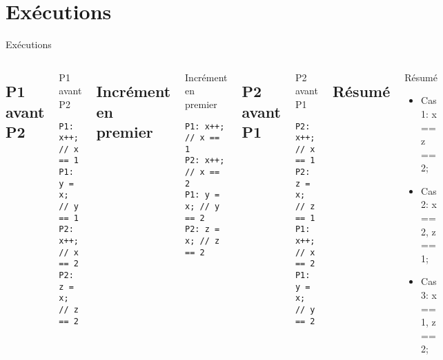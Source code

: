\def\sectitle{Exécutions}
\section{\sectitle}
\begin{frame}[containsverbatim]{\sectitle}

\begin{columns}[t]
\def\subsectitle{P1 avant P2}
\subsection{\subsectitle}

\begin{exampleblock}{\subsectitle}
\begin{verbatim}
P1: x++; // x == 1
P1: y = x; // y == 1
P2: x++; // x == 2
P2: z = x; // z == 2
\end{verbatim}
\end{exampleblock}

\def\subsectitle{Incrément en premier}
\subsection{\subsectitle}

\begin{exampleblock}{\subsectitle}
\begin{verbatim}
P1: x++; // x == 1
P2: x++; // x == 2
P1: y = x; // y == 2
P2: z = x; // z == 2
\end{verbatim}
\end{exampleblock}

\def\subsectitle{P2 avant P1}
\subsection{\subsectitle}

\begin{exampleblock}{\subsectitle}
\begin{verbatim}
P2: x++; // x == 1
P2: z = x; // z == 1
P1: x++; // x == 2
P1: y = x; // y == 2
\end{verbatim}
\end{exampleblock}

\def\subsectitle{Résumé}
\subsection{\subsectitle}

\begin{block}{\subsectitle}
\begin{itemize}
\item Cas 1: x == z == 2;
\item Cas 2: x == 2, z == 1;
\item Cas 3: x == 1, z == 2;
\end{itemize}
\end{block}
\end{columns}

\end{frame}

